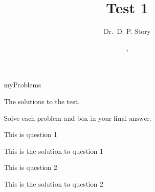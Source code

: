 \documentclass{article}
\title[T1]{Test 1}
\author{Dr.\ D. P. Story}
\date{\thisterm, \the\year}
\begin{document}
\maketitle

\begin{exam}{myProblems}

\ifsolutionsonly
\begin{instructions}[Solutions:]
The solutions to the test.
\end{instructions}
\else
\begin{instructions}[Instructions:]
Solve each problem and box in your final $\boxed{\text{answer}}$.
\end{instructions}
\fi

\begin{theseproblems}

\begin{problem}[5]
This is question 1
\begin{solution}
This is the solution to question 1
\end{solution}
\end{problem}

\begin{problem}[5]
This is question 2
\begin{solution}
This is the solution to question 2
\end{solution}
\end{problem}

\end{theseproblems}
\end{exam}
\end{document}
